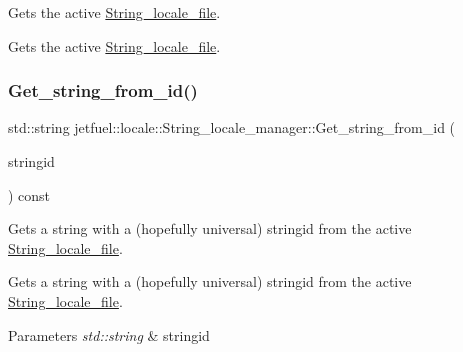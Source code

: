 Gets the active \hyperlink{classjetfuel_1_1locale_1_1String__locale__file}{String\+\_\+locale\+\_\+file}. 

Gets the active \hyperlink{classjetfuel_1_1locale_1_1String__locale__file}{String\+\_\+locale\+\_\+file}. \mbox{\label{classjetfuel_1_1locale_1_1String__locale__manager_a215fa1aaf302e45b1ab375f764a8d101}} 
\subsubsection{\texorpdfstring{Get\+\_\+string\+\_\+from\+\_\+id()}{Get\_string\_from\_id()}}
{\footnotesize\ttfamily std\+::string jetfuel\+::locale\+::\+String\+\_\+locale\+\_\+manager\+::\+Get\+\_\+string\+\_\+from\+\_\+id (\begin{DoxyParamCaption}\item[{const std\+::string}]{stringid }\end{DoxyParamCaption}) const\hspace{0.3cm}{\ttfamily [inline]}}



Gets a string with a (hopefully universal) stringid from the active \hyperlink{classjetfuel_1_1locale_1_1String__locale__file}{String\+\_\+locale\+\_\+file}. 

Gets a string with a (hopefully universal) stringid from the active \hyperlink{classjetfuel_1_1locale_1_1String__locale__file}{String\+\_\+locale\+\_\+file}.


\begin{DoxyParams}{Parameters}
{\em std\+::string} & stringid \\
\hline
\end{DoxyParams}
\mbox{\label{classjetfuel_1_1locale_1_1String__locale__manager_a2a972352f2b52a6aec947aad636ca6f1}} 
